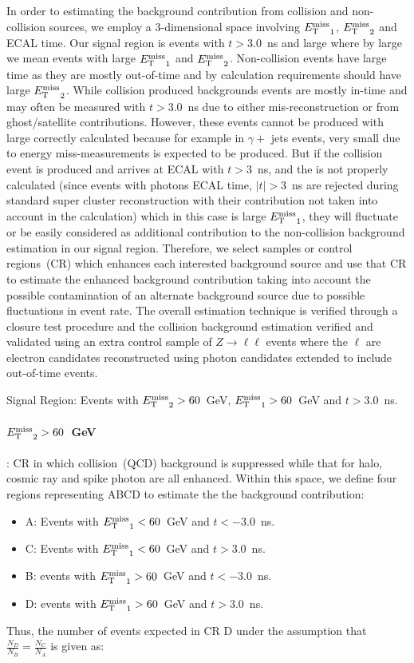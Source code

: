 In order to estimating the background contribution from collision and non-collision sources, we employ a 3-dimensional space involving ${E_{\mathrm{T}}^{\text{miss}}}_{1}$, ${E_{\mathrm{T}}^{\text{miss}}}_{2}$ and ECAL time.  Our signal region is events with $t > 3.0$~ns and large \MET where by large \MET we mean events with  large  ${E_{\mathrm{T}}^{\text{miss}}}_{1}$ and  ${E_{\mathrm{T}}^{\text{miss}}}_{2}$. Non-collision events have large time as they are mostly out-of-time and by \MET calculation requirements should have large  ${E_{\mathrm{T}}^{\text{miss}}}_{2}$. While collision produced backgrounds events are mostly in-time and may often be measured with $t > 3.0$~ns due to either mis-reconstruction or from ghost/satellite contributions. However, these events cannot be produced with large correctly calculated \MET because for example in $\gamma +$ jets events, very small \MET due to energy miss-measurements is expected to be produced.
 But if the collision event is produced and arrives at ECAL with $t > 3$~ns, and the \MET is not properly calculated (since events with photons ECAL time, $|t| > 3$~ns are rejected during standard super cluster reconstruction with their \pt contribution  not taken into account in the \MET calculation) which in this case is large ${E_{\mathrm{T}}^{\text{miss}}}_{1}$, they will fluctuate or be easily considered as additional contribution to the non-collision background estimation in our signal region.
Therefore, we select samples or control regions~(CR) which enhances each interested background source and use that CR to estimate the enhanced background contribution taking into account the possible contamination of an alternate background source due to possible fluctuations in event rate.
The overall estimation technique is verified through a closure test procedure and the collision background estimation verified and validated using an extra control sample of $Z \rightarrow \ell \ell$ events where the $\ell$ are electron candidates reconstructed using photon candidates extended to include out-of-time events.

Signal Region: Events with ${E_{\mathrm{T}}^{\text{miss}}}_{2} > 60$~GeV, ${E_{\mathrm{T}}^{\text{miss}}}_{1} > 60$~GeV and $t > 3.0$~ns.
\paragraph*{${E_{\mathrm{T}}^{\text{miss}}}_{2} > 60$~GeV } : CR in which collision~(QCD) background is suppressed while that for halo, cosmic ray and spike photon are all enhanced.
Within this space, we define four regions representing ABCD to estimate the the background contribution:
\begin{itemize}
\item A: Events with ${E_{\mathrm{T}}^{\text{miss}}}_{1} < 60$~GeV and $t < -3.0$~ns.
\item C: Events with ${E_{\mathrm{T}}^{\text{miss}}}_{1} < 60$~GeV and $t >  3.0$~ns.
\item B: events with ${E_{\mathrm{T}}^{\text{miss}}}_{1} > 60$~GeV and $t < -3.0$~ns.
\item D: events with ${E_{\mathrm{T}}^{\text{miss}}}_{1} > 60$~GeV and $t >  3.0$~ns.
\end{itemize}
Thus, the number of events expected in CR D under the assumption that $\frac{N_{D}}{N_{B}} = \frac{N_{C}}{N_{A}}$  is given as:

